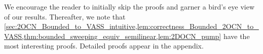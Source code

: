 \documentclass[11pt,a4paper]{amsart}
\theoremstyle{definition}
\newcommand{\shtodo}[1]{\todo[color=cyan!25,size=\small]{SH: #1}}
\begin{document}
	
	We encourage the reader to initially skip the proofs and garner a bird's eye view of our results. 
	Thereafter, we note that
	\cref{sec:2OCN_Bounded_to_VASS_intuitive,lem:correctness_Bounded_2OCN_to_VASS,thm:bounded_sweeping_equiv_semilinear,lem:2DOCN_pump}
	have the most interesting proofs. Detailed proofs appear in the appendix.
	
	
	
	
	
\end{document}
